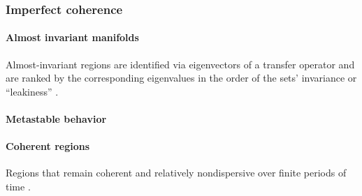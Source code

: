 \documentclass{article}
\theoremstyle{definition} \newtheorem{definition}{Definition}  \newtheorem{example}{Example}
\theoremstyle{remark} \newtheorem{remark}{Remark}
\newcounter{ct}
\begin{document}
\subsubsection{Imperfect coherence}%
\paragraph{Almost invariant manifolds}
 Almost-invariant regions are identified via eigenvectors of a transfer operator and are ranked by the corresponding eigenvalues in the order of the sets' invariance or ``leakiness'' \citep{froyland2009almost}.
    
    
    
\paragraph{Metastable behavior}\label{sec:metastable}
   \citep{brinkman2022metastable}
    
    
\paragraph{Coherent regions}
Regions that remain coherent and relatively nondispersive over finite periods of time \citep{fackeldey2019metastable}.






\newpage
\end{document}
